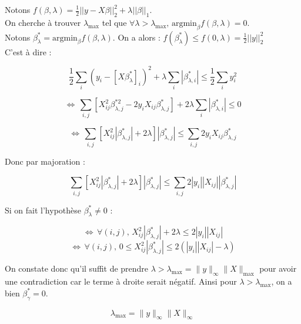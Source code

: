 \documentclass[11pt]{article}
\begin{document}
\begin{solution}  %

Notons $f(\beta,\lambda)=\frac{1}{2}||y-X\beta||^2_2+\lambda ||\beta||_1$.\\

On cherche à trouver $\lambda_{\max}$ tel que $\forall \lambda > \lambda_{\max},\, \textrm{argmin}_{\beta}f(\beta,\lambda)=0$.\\

Notons $\beta_\lambda^*=\textrm{argmin}_{\beta}f(\beta,\lambda)$. On a alors : $f(\beta^*_\lambda) \leq f(0,\lambda)=\frac{1}{2}||y||^2_2$ \\

C'est à dire :

$$\frac{1}{2}\sum_i (y_i-[X\beta_\lambda^*]_i)^2+\lambda \sum_i |\beta^*_{\lambda,i}|\leq \frac{1}{2}\sum_i y_i^2 $$

$$\Leftrightarrow \, \sum_{i,j} [X_{ij}^2\beta_{\lambda,j}^{*2}-2y_iX_{ij}\beta_{\lambda,j}^*] + 2\lambda \sum_i |\beta_{\lambda,i}^*| \leq 0$$

$$\Leftrightarrow \, \sum_{i,j} [X_{ij}^2|\beta^*_{\lambda,j}| + 2\lambda ]|\beta_{\lambda,j}^*| \leq \sum_{i,j} 2y_iX_{ij}\beta_{\lambda,j}^*$$

Donc par majoration :

$$\sum_{i,j} [X_{ij}^2|\beta^*_{\lambda,j}| + 2\lambda ]|\beta_{\lambda,j}^*| \leq \sum_{i,j} 2|y_i||X_{ij}||\beta_{\lambda,j}^*|$$

Si on fait l'hypothèse $\beta_{\lambda}^* \neq 0$ :

$$\Leftrightarrow \, \forall (i,j),\, X_{ij}^2|\beta^*_{\lambda,j}| + 2\lambda \leq 2|y_i||X_{ij}|$$
$$\Leftrightarrow \, \forall (i,j),\, 0\leq X_{ij}^2|\beta^*_{\lambda,j}| \leq 2(|y_i||X_{ij}|-\lambda)$$

On constate donc qu'il suffit de prendre $\lambda > \lambda_{\max}=\|y\|_{\infty}\|X\|_{\max}$ pour avoir une contradiction car le terme à droite serait négatif. Ainsi pour $\lambda > \lambda_{\max}$, on a bien $\beta^*_{\gamma}=0$.

\begin{equation}
    \lambda_{\max} = \|y\|_{\infty}\|X\|_{\infty}
\end{equation}

\end{solution}
\end{document}
